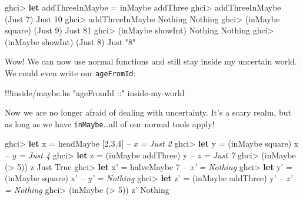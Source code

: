 \documentclass[]{article}
\newenvironment{Shaded}{}{}
\newcommand{\KeywordTok}[1]{\textcolor[rgb]{0.00,0.44,0.13}{\textbf{{#1}}}}
\newcommand{\DataTypeTok}[1]{\textcolor[rgb]{0.56,0.13,0.00}{{#1}}}
\newcommand{\DecValTok}[1]{\textcolor[rgb]{0.25,0.63,0.44}{{#1}}}
\newcommand{\StringTok}[1]{\textcolor[rgb]{0.25,0.44,0.63}{{#1}}}
\newcommand{\CommentTok}[1]{\textcolor[rgb]{0.38,0.63,0.69}{\textit{{#1}}}}
\newcommand{\FunctionTok}[1]{\textcolor[rgb]{0.02,0.16,0.49}{{#1}}}
\newcommand{\NormalTok}[1]{{#1}}
\begin{document}
\begin{Shaded}
\begin{Highlighting}[]
\NormalTok{ghci}\FunctionTok{>} \KeywordTok{let} \NormalTok{addThreeInMaybe }\FunctionTok{=} \NormalTok{inMaybe addThree}
\NormalTok{ghci}\FunctionTok{>} \NormalTok{addThreeInMaybe (}\DataTypeTok{Just} \DecValTok{7}\NormalTok{)}
\DataTypeTok{Just} \DecValTok{10}
\NormalTok{ghci}\FunctionTok{>} \NormalTok{addThreeInMaybe }\DataTypeTok{Nothing}
\DataTypeTok{Nothing}
\NormalTok{ghci}\FunctionTok{>} \NormalTok{(inMaybe square) (}\DataTypeTok{Just} \DecValTok{9}\NormalTok{)}
\DataTypeTok{Just} \DecValTok{81}
\NormalTok{ghci}\FunctionTok{>} \NormalTok{(inMaybe showInt) }\DataTypeTok{Nothing}
\DataTypeTok{Nothing}
\NormalTok{ghci}\FunctionTok{>} \NormalTok{(inMaybe showInt) (}\DataTypeTok{Just} \DecValTok{8}\NormalTok{)}
\DataTypeTok{Just} \StringTok{"8"}
\end{Highlighting}
\end{Shaded}

Wow! We can now use normal functions and still stay inside my uncertain
world. We could even write our \texttt{ageFromId}:

\begin{Shaded}
\begin{Highlighting}[]
\FunctionTok{!!!}\NormalTok{inside}\FunctionTok{/}\NormalTok{maybe}\FunctionTok{.}\NormalTok{hs }\StringTok{"ageFromId ::"} \NormalTok{inside}\FunctionTok{-}\NormalTok{my}\FunctionTok{-}\NormalTok{world}
\end{Highlighting}
\end{Shaded}

Now we are no longer afraid of dealing with uncertainty. It's a scary
realm, but as long as we have \texttt{inMaybe}\ldots{}all of our normal
tools apply!

\begin{Shaded}
\begin{Highlighting}[]
\NormalTok{ghci}\FunctionTok{>} \KeywordTok{let} \NormalTok{x }\FunctionTok{=} \NormalTok{headMaybe [}\DecValTok{2}\NormalTok{,}\DecValTok{3}\NormalTok{,}\DecValTok{4}\NormalTok{]        }\CommentTok{-- x = Just 2}
\NormalTok{ghci}\FunctionTok{>} \KeywordTok{let} \NormalTok{y }\FunctionTok{=} \NormalTok{(inMaybe square) x       }\CommentTok{-- y = Just 4}
\NormalTok{ghci}\FunctionTok{>} \KeywordTok{let} \NormalTok{z }\FunctionTok{=} \NormalTok{(inMaybe addThree) y     }\CommentTok{-- z = Just 7}
\NormalTok{ghci}\FunctionTok{>} \NormalTok{(inMaybe (}\FunctionTok{>} \DecValTok{5}\NormalTok{)) z}
\DataTypeTok{Just} \DataTypeTok{True}
\NormalTok{ghci}\FunctionTok{>} \KeywordTok{let} \NormalTok{x' }\FunctionTok{=} \NormalTok{halveMaybe }\DecValTok{7}            \CommentTok{-- x' = Nothing}
\NormalTok{ghci}\FunctionTok{>} \KeywordTok{let} \NormalTok{y' }\FunctionTok{=} \NormalTok{(inMaybe square) x'     }\CommentTok{-- y' = Nothing}
\NormalTok{ghci}\FunctionTok{>} \KeywordTok{let} \NormalTok{z' }\FunctionTok{=} \NormalTok{(inMaybe addThree) y'   }\CommentTok{-- z' = Nothing}
\NormalTok{ghci}\FunctionTok{>} \NormalTok{(inMaybe (}\FunctionTok{>} \DecValTok{5}\NormalTok{)) z'}
\DataTypeTok{Nothing}
\end{Highlighting}
\end{Shaded}
\end{document}
